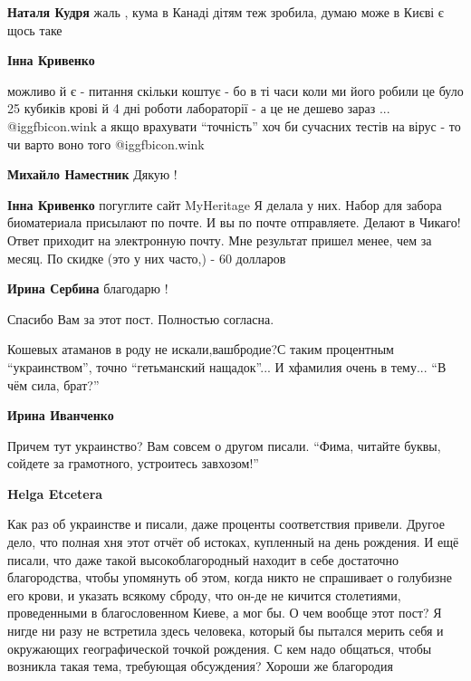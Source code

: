 \begin{itemize}
\begin{itemize}
\textbf{Наталя Кудря} жаль , кума в Канаді дітям теж зробила, думаю може в Києві є щось таке

\textbf{Інна Кривенко} 

можливо й є - питання скільки коштує - бо в ті часи коли ми його робили це було
25 кубиків крові й 4 дні роботи лабораторії - а це не дешево зараз ... @igg{fbicon.wink} а якщо
врахувати \enquote{точність} хоч би сучасних тестів на вірус - то чи варто воно
того @igg{fbicon.wink} 


\textbf{Михайло Наместник} Дякую !

\textbf{Інна Кривенко} погуглите сайт MyHeritage
Я делала у них. Набор для забора биоматериала присылают по почте. И вы по почте отправляете. Делают в Чикаго! Ответ приходит на электронную почту. Мне результат пришел менее, чем за месяц.
По скидке (это у них часто,) - 60 долларов

\textbf{Ирина Сербина} благодарю !
\end{itemize} %

Спасибо Вам за этот пост. Полностью согласна.


Кошевых атаманов в роду не искали,вашбродие?С таким
процентным \enquote{украинством}, точно \enquote{гетьманский нащадок}... И хфамилия очень в
тему... \enquote{В чём сила, брат?}

\begin{itemize} %
\textbf{Ирина Иванченко} 

Причем тут украинство? Вам совсем о другом писали. \enquote{Фима, читайте буквы,
сойдете за грамотного, устроитесь завхозом!}

\textbf{Helga Etcetera} 

Как раз об украинстве и писали, даже проценты соответствия привели. Другое
дело, что полная хня этот отчёт об истоках, купленный на день рождения. И ещё
писали, что даже такой высокоблагородный находит в себе достаточно
благородства, чтобы упомянуть об этом, когда никто не спрашивает о голубизне
его крови, и указать всякому сброду, что он-де не кичится столетиями,
проведенными в благословенном Киеве, а мог бы. О чем вообще этот пост? Я нигде
ни разу не встретила здесь человека, который бы пытался мерить себя и
окружающих географической точкой рождения. С кем надо общаться, чтобы возникла
такая тема, требующая обсуждения? Хороши же благородия


\end{itemize}
\end{itemize}
